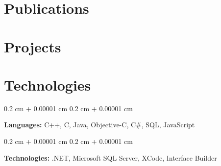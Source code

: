 \documentclass[11pt, letterpaper]{article}
\newenvironment{onecolentry}{
    \begin{adjustwidth}{
        0.2 cm + 0.00001 cm
    }{
        0.2 cm + 0.00001 cm
    }
}{
    \end{adjustwidth}
} %
\begin{document}
\section{Publications}



\section{Projects}

\section{Technologies}




\begin{onecolentry}
    \textbf{Languages:} C++, C, Java, Objective-C, C\#, SQL, JavaScript
\end{onecolentry}

\vspace{0.2 cm}

\begin{onecolentry}
    \textbf{Technologies:} .NET, Microsoft SQL Server, XCode, Interface Builder
\end{onecolentry}
\end{document}
